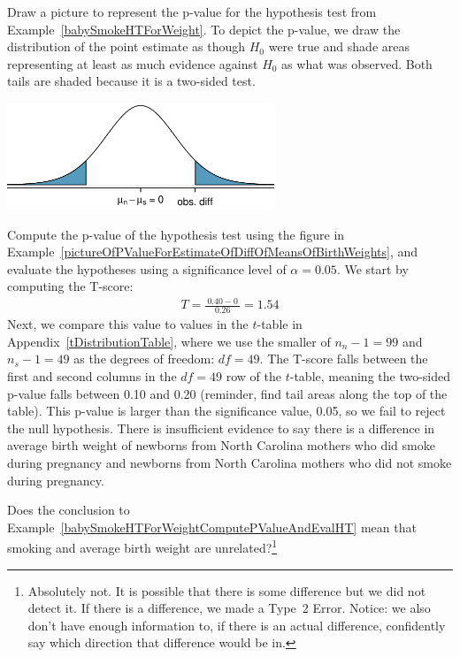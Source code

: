 {\begin{example}{Draw a picture to represent the p-value for the hypothesis test from Example~\ref{babySmokeHTForWeight}.} \label{pictureOfPValueForEstimateOfDiffOfMeansOfBirthWeights}
To depict the p-value, we draw the distribution of the point estimate as though $H_0$ were true and shade areas representing at least as much evidence against $H_0$ as what was observed. Both tails are shaded because it is a two-sided test.
\begin{center}
\includegraphics[width=0.6\textwidth]{ch_inference_for_means/figures/distOfDiffOfSampleMeansForBWOfBabySmokeData/distOfDiffOfSampleMeansForBWOfBabySmokeData}
\end{center}
\end{example}

\begin{example}{Compute the p-value of the hypothesis test using the figure in Example~\ref{pictureOfPValueForEstimateOfDiffOfMeansOfBirthWeights}, and evaluate the hypotheses using a significance level of $\alpha=0.05$.} \label{babySmokeHTForWeightComputePValueAndEvalHT}
We start by computing the T-score:
\begin{eqnarray*}
T = \frac{\ 0.40 - 0\ }{0.26} = 1.54
\end{eqnarray*}
Next, we compare this value to values in the $t$-table in Appendix~\vref{tDistributionTable}, where we use the smaller of $n_n - 1 = 99$ and $n_s - 1 = 49$ as the degrees of freedom: $df = 49$. The T-score falls between the first and second columns in the $df = 49$ row of the $t$-table, meaning the two-sided p-value falls between 0.10 and 0.20 (reminder, find tail areas along the top of the table). This p-value is larger than the significance value, 0.05, so we fail to reject the null hypothesis. There is insufficient evidence to say there is a difference in average birth weight of newborns from North Carolina mothers who did smoke during pregnancy and newborns from North Carolina mothers who did not smoke during pregnancy.
\end{example}

\begin{exercise}
Does the conclusion to Example~\ref{babySmokeHTForWeightComputePValueAndEvalHT} mean that smoking and average birth weight are unrelated?\footnote{Absolutely not. It is possible that there is some difference but we did not detect it. If there is a difference, we made a Type~2 Error. Notice: we also don't have enough information to, if there is an actual difference, confidently say which direction that difference would be in.}
\end{exercise}

}
